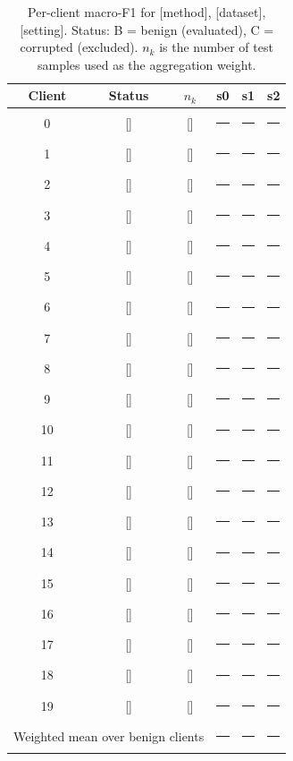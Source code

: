 \documentclass[11pt]{article}
\newcommand{\vb}{\rule[-0.25ex]{1.5em}{0.4pt}}
\newcommand{\fillin}[1]{{\color{red}[#1]}}
\begin{document}
\begin{table}[!ht]\centering\scriptsize
\caption{Per-client macro-F1 for \fillin{method}, \fillin{dataset}, \fillin{setting}. Status: B = benign (evaluated), C = corrupted (excluded). $n_k$ is the number of test samples used as the aggregation weight.}
\label{tab:s-perclient}
\begin{tabular}{c|c|c|ccc}
\toprule
Client & Status & $n_k$ & s0 & s1 & s2 \\
\midrule
0 & \fillin{} & \fillin{} & \vb & \vb & \vb \\
1 & \fillin{} & \fillin{} & \vb & \vb & \vb \\
2 & \fillin{} & \fillin{} & \vb & \vb & \vb \\
3 & \fillin{} & \fillin{} & \vb & \vb & \vb \\
4 & \fillin{} & \fillin{} & \vb & \vb & \vb \\
5 & \fillin{} & \fillin{} & \vb & \vb & \vb \\
6 & \fillin{} & \fillin{} & \vb & \vb & \vb \\
7 & \fillin{} & \fillin{} & \vb & \vb & \vb \\
8 & \fillin{} & \fillin{} & \vb & \vb & \vb \\
9 & \fillin{} & \fillin{} & \vb & \vb & \vb \\
10 & \fillin{} & \fillin{} & \vb & \vb & \vb \\
11 & \fillin{} & \fillin{} & \vb & \vb & \vb \\
12 & \fillin{} & \fillin{} & \vb & \vb & \vb \\
13 & \fillin{} & \fillin{} & \vb & \vb & \vb \\
14 & \fillin{} & \fillin{} & \vb & \vb & \vb \\
15 & \fillin{} & \fillin{} & \vb & \vb & \vb \\
16 & \fillin{} & \fillin{} & \vb & \vb & \vb \\
17 & \fillin{} & \fillin{} & \vb & \vb & \vb \\
18 & \fillin{} & \fillin{} & \vb & \vb & \vb \\
19 & \fillin{} & \fillin{} & \vb & \vb & \vb \\
\midrule
\multicolumn{3}{l|}{Weighted mean over benign clients} & \vb & \vb & \vb \\
\bottomrule\end{tabular}\end{table}
\end{document}
